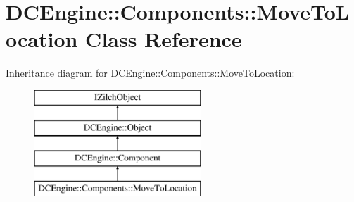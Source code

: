 \hypertarget{classDCEngine_1_1Components_1_1MoveToLocation}{\section{D\-C\-Engine\-:\-:Components\-:\-:Move\-To\-Location Class Reference}
\label{classDCEngine_1_1Components_1_1MoveToLocation}
}
Inheritance diagram for D\-C\-Engine\-:\-:Components\-:\-:Move\-To\-Location\-:\begin{figure}[H]
\begin{center}
\leavevmode
\includegraphics[height=4.000000cm]{classDCEngine_1_1Components_1_1MoveToLocation}
\end{center}
\end{figure}
